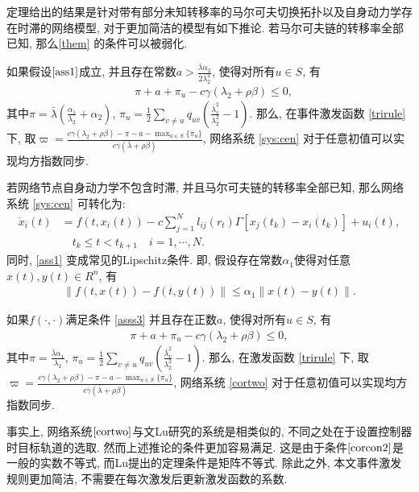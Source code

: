         定理给出的结果是针对带有部分未知转移率的马尔可夫切换拓扑以及自身动力学存在时滞的网络模型, 对于更加简洁的模型有如下推论. 若马尔可夫链的转移率全部已知, 那么\autoref{them} 的条件可以被弱化.
        \begin{cor}
        如果假设$\ref{ass1}$成立, 并且存在常数$a>\frac{\bar{\lambda}\alpha_2}{2\lambda_2^2}$, 使得对所有$u\in S$, 有
            \begin{align*}
            &\pi+a+\pi_u-c\gamma(\lambda_2+\rho\beta)\leq0,
            \end{align*}
        其中$\pi=\bar{\lambda}(\frac{\alpha_1}{\lambda_2}+\alpha_2)$, $\pi_u=\frac{1}{2}\sum_{v\neq u}q_{uv}(\frac{\bar{\lambda}^2_{v}}{\lambda_2^2}-1)$.
        那么, 在事件激发函数 \eqref{trirule} 下, 取$\varpi=\frac{c\gamma(\lambda_2+\rho\beta)-\pi-a-\max_{u\in S}\{\pi_u\}}{c\bar\gamma(\bar\lambda+\rho\beta)}$, 网络系统 \eqref{sys:cen} 对于任意初值可以实现均方指数同步.
        \end{cor}
        若网络节点自身动力学不包含时滞, 并且马尔可夫链的转移率全部已知, 那么网络系统 \eqref{sys:cen} 可转化为:
        \begin{align}\label{cortwo}
          \nonumber \dot{x}_{i}(t)&=f(t,x_{i}(t))-c\sum^N_{j=1}l_{ij}(r_{t})\Gamma[x_{j}(t_k)
            -x_{i}(t_{k})]+u_i(t),\\
            &\quad t_{k}\leq t< t_{k+1} \quad i = 1,\cdots,N.
        \end{align}
        同时, \autoref{ass1} 变成常见的Lipschitz条件. 即, 假设存在常数$\alpha_1$使得对任意$x(t), y(t)\in  R^n$, 有
        \begin{align}\label{asss3}
        \|f(t,x(t))-f(t,y(t))\|\leq\alpha_1\|x(t)-y(t)\|.
        \end{align}
        \begin{cor}\label{cor2}
        如果$f(\cdot,\cdot)$满足条件 \eqref{asss3} 并且存在正数$a$, 使得对所有$u\in S$, 有
        \begin{align}\label{corcon2}
            \pi+a+\pi_u-c\gamma(\lambda_2+\rho\beta)\leq0,
        \end{align}
        其中$\pi=\frac{\bar{\lambda}\alpha_1}{\lambda_2}$, $\pi_u=\frac{1}{2}\sum_{v\neq u}q_{uv}(\frac{\bar{\lambda}^2_{v}}{\lambda_2^2}-1)$.
        那么, 在激发函数 \eqref{trirule} 下, 取$\varpi=\frac{c\gamma(\lambda_2+\rho\beta)-\pi-a-\max_{u\in S}\{\pi_u\}}{c\bar\gamma(\bar\lambda+\rho\beta)}$, 网络系统 \eqref{cortwo} 对于任意初值可以实现均方指数同步.
        \end{cor}
        \begin{rem}
        事实上, 网络系统$\eqref{cortwo}$与文Lu研究的系统是相类似的, 不同之处在于设置控制器时目标轨道的选取. 然而上述推论的条件更加容易满足. 这是由于条件$\eqref{corcon2}$是一般的实数不等式, 而Lu提出的定理条件是矩阵不等式. 除此之外, 本文事件激发规则更加简洁, 不需要在每次激发后更新激发函数的系数.
       \end{rem}
